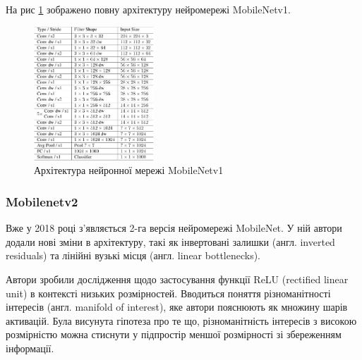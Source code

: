 На рис \ref{fig:cnn:mobilenetv1_architecture} зображено повну архітектуру нейромережі MobileNetv1.

\begin{figure}[H]
    \centering
    \includegraphics[width=0.4\textwidth]{images/cnn_mobilenetv1_architecture}
    \caption{Архітектура нейронної мережі MobileNetv1   \cite{bib:mobilenet:v1}
        \label{fig:cnn:mobilenetv1_architecture}
    }
\end{figure}

\subsubsection{Mobilenetv2}

Вже у 2018 році з'являється 2-га версія нейромережі MobileNet. У ній автори додали нові зміни в
архітектуру, такі як інвертовані залишки (англ. inverted residuals) та
лінійні вузькі місця (англ. linear bottlenecks).

Автори зробили дослідження щодо застосування функції ReLU (rectified linear unit) в
контексті низьких розмірностей. Вводиться поняття різноманітності інтересів  (англ. manifold of interest),
яке автори пояснюють як множину шарів активацій. Була висунута гіпотеза про те що,
різноманітність інтересів з високою розмірністю можна стиснути у підпростір меншої розмірності
зі збереженням інформації.

